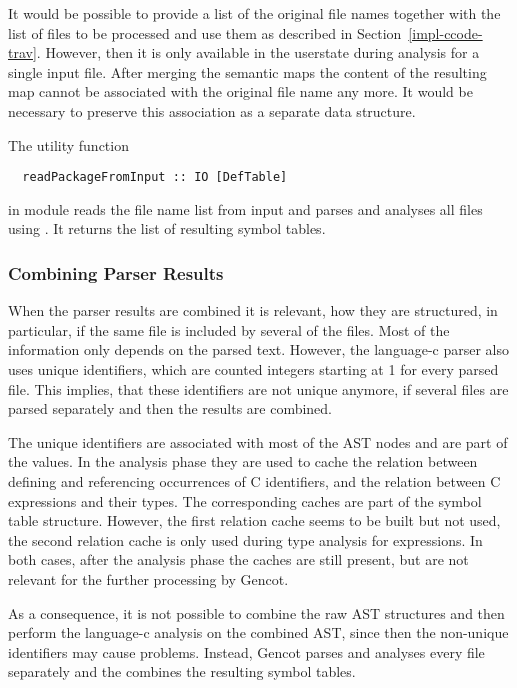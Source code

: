 It would be possible to provide a list of the original file names together with the list of files to be processed and
use them as described in Section~\ref{impl-ccode-trav}. However, then it is only available in the userstate during 
analysis for a single input file. After merging the semantic maps the content of the resulting map cannot be associated
with the original file name any more. It would be necessary to preserve this association as a separate data structure.

The utility function
\begin{verbatim}
  readPackageFromInput :: IO [DefTable]
\end{verbatim}
in module  reads the file name list from input and parses and analyses all files using 
. It returns the list of resulting symbol tables.

\subsubsection{Combining Parser Results}

When the parser results are combined it is relevant, how they are structured, in particular, if the same file
is included by several of the  files. Most of the information only depends on the parsed text.
However, the language-c parser also uses unique identifiers, which are counted integers starting at 1 for every
parsed file. This implies, that these identifiers are not unique anymore, if several files are parsed separately
and then the results are combined.

The unique identifiers are associated with most of the AST nodes and are part of the  values.
In the analysis phase they are used to cache the relation between defining and referencing occurrences of C identifiers,
and the relation between C expressions and their types. The corresponding caches are part of the symbol table structure.
However, the first relation cache seems to be built but not used, the second relation cache is only used during 
type analysis for expressions. In both cases, after the analysis phase the caches are still present, but are not 
relevant for the further processing by Gencot.

As a consequence, it is not possible to combine the raw AST structures and then perform the language-c analysis
on the combined AST, since then the non-unique identifiers may cause problems. Instead, Gencot parses and analyses
every file separately and the combines the resulting symbol tables.

